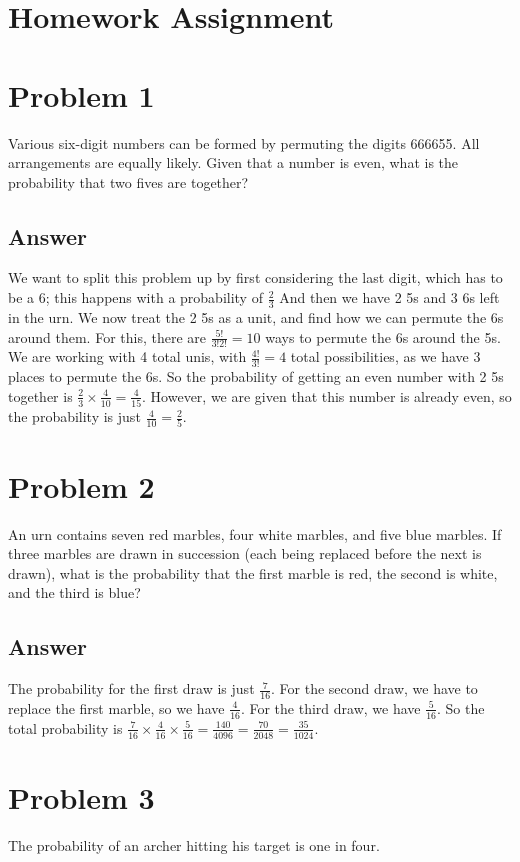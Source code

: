 \documentclass{article}
\begin{document}
\section*{Homework Assignment}

\section{Problem 1}
Various six-digit numbers can be formed by permuting the digits 666655. All arrangements are equally likely. Given that a number is even, what is the probability that two fives are together?
\subsection{Answer}
We want to split this problem up by first considering the last digit, which has to be a 6; this happens with a probability of $\frac{2}{3}$ And then we have 2 5s and 3 6s left in the urn. We now treat the 2 5s as a unit, and find how we can permute the 6s around them. For this, there are $\frac{5!}{3!2!} = 10$ ways to permute the 6s around the 5s. We are working with 4 total unis, with $\frac{4!}{3!} = 4$ total possibilities, as we have 3 places to permute the 6s. So the probability of getting an even number with 2 5s together is $\frac{2}{3} \times \frac{4}{10} = \frac{4}{15}$. However, we are given that this number is already even, so the probability is just $\frac{4}{10} = \frac{2}{5}$.

\section{Problem 2}
An urn contains seven red marbles, four white marbles, and five blue marbles. If three marbles are drawn in succession (each being replaced before the next is drawn), what is the probability that the first marble is red, the second is white, and the third is blue?
\subsection{Answer}
The probability for the first draw is just $\frac{7}{16}$. For the second draw, we have to replace the first marble, so we have $\frac{4}{16}$. For the third draw, we have $\frac{5}{16}$. So the total probability is $\frac{7}{16} \times \frac{4}{16} \times \frac{5}{16} = \frac{140}{4096} = \frac{70}{2048} = \frac{35}{1024}$.

\section{Problem 3}
The probability of an archer hitting his target is one in four.
\end{document}
